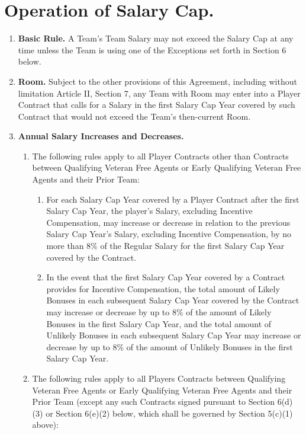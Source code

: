 \documentclass[
]{book}
\providecommand{\tightlist}{%
  \setlength{\itemsep}{0pt}\setlength{\parskip}{0pt}}
\begin{document}
\hypertarget{operation-of-salary-cap.}{%
\section{Operation of Salary Cap.}\label{operation-of-salary-cap.}}

\begin{enumerate}
\def\labelenumi{(\alph{enumi})}
\tightlist
\item
  \textbf{Basic Rule.} A Team's Team Salary may not exceed the Salary Cap at any time unless the Team is using one of the Exceptions set forth in Section 6 below.
\item
  \textbf{Room.} Subject to the other provisions of this Agreement, including without limitation Article II, Section 7, any Team with Room may enter into a Player Contract that calls for a Salary in the first Salary Cap Year covered by such Contract that would not exceed the Team's then-current Room.
\item
  \textbf{Annual Salary Increases and Decreases.}

  \begin{enumerate}
  \def\labelenumii{(\arabic{enumii})}
  \tightlist
  \item
    The following rules apply to all Player Contracts other than Contracts between Qualifying Veteran Free Agents or Early Qualifying Veteran Free Agents and their Prior Team:

    \begin{enumerate}
    \def\labelenumiii{(\roman{enumiii})}
    \tightlist
    \item
      For each Salary Cap Year covered by a Player Contract after the first Salary Cap Year, the player's Salary, excluding Incentive Compensation, may increase or decrease in relation to the previous Salary Cap Year's Salary, excluding Incentive Compensation, by no more than 8\% of the Regular Salary for the first Salary Cap Year covered by the Contract.
    \item
      In the event that the first Salary Cap Year covered by a Contract provides for Incentive Compensation, the total amount of Likely Bonuses in each subsequent Salary Cap Year covered by the Contract may increase or decrease by up to 8\% of the amount of Likely Bonuses in the first Salary Cap Year, and the total amount of Unlikely Bonuses in each subsequent Salary Cap Year may increase or decrease by up to 8\% of the amount of Unlikely Bonuses in the first Salary Cap Year.
    \end{enumerate}
  \item
    The following rules apply to all Players Contracts between Qualifying Veteran Free Agents or Early Qualifying Veteran Free Agents and their Prior Team (except any such Contracts signed pursuant to Section 6(d)(3) or Section 6(e)(2) below, which shall be governed by Section 5(c)(1) above):


\end{enumerate}
\end{enumerate}
\end{document}
